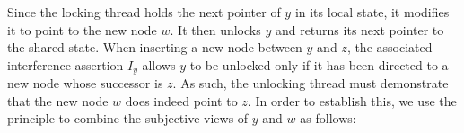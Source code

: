 %
%
\noindent Since the locking thread holds the next pointer of $y$ in
its local state, it modifies it to point to the new node $w$. It then
unlocks $y$ and returns its next pointer to the shared state. When
inserting a new node between $y$ and $z$, the associated interference
assertion $I_y$ allows $y$ to be unlocked only if it has been directed
to a new node whose successor is $z$. As such, the unlocking thread
must demonstrate that the new node $w$ does indeed point to $z$. In
order to establish this, we use the \mergeRule principle to combine
the subjective views of $y$ and $w$ as follows: \vspace{0pt}

